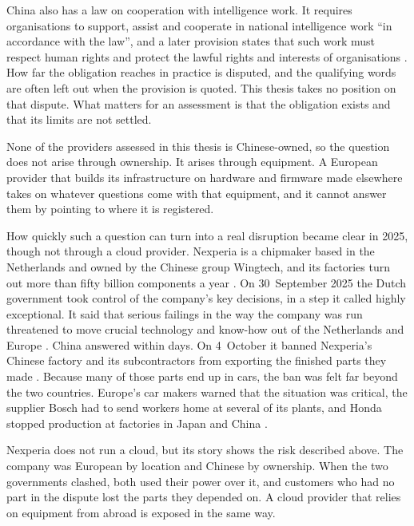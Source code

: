 China also has a law on cooperation with intelligence work. It requires
organisations to support, assist and cooperate in national intelligence work
\enquote{in accordance with the law}, and a later provision states that such work
must respect human rights and protect the lawful rights and interests of
organisations \cite{ChinaNIL_2017}. How far the obligation reaches in practice is
disputed, and the qualifying words are often left out when the provision is
quoted. This thesis takes no position on that dispute. What matters for an
assessment is that the obligation exists and that its limits are not settled.

None of the providers assessed in this thesis is Chinese-owned, so the question
does not arise through ownership. It arises through equipment. A European provider
that builds its infrastructure on hardware and firmware made elsewhere takes on
whatever questions come with that equipment, and it cannot answer them by pointing
to where it is registered.

How quickly such a question can turn into a real disruption became clear in 2025,
though not through a cloud provider. Nexperia is a chipmaker based in the
Netherlands and owned by the Chinese group Wingtech, and its factories turn out
more than fifty billion components a year \cite{AlJazeera_Nexperia_2025}. On
30~September 2025 the Dutch government took control of the company's key decisions,
in a step it called highly exceptional. It said that serious failings in the way
the company was run threatened to move crucial technology and know-how out of the
Netherlands and Europe \cite{NL_Nexperia_2025}. China answered within days. On
4~October it banned Nexperia's Chinese factory and its subcontractors from exporting
the finished parts they made \cite{AlJazeera_Nexperia_2025}. Because many of those
parts end up in cars, the ban was felt far beyond the two countries. Europe's car
makers warned that the situation was critical, the supplier Bosch had to send
workers home at several of its plants, and Honda stopped production at factories in
Japan and China \cite{Sourceability_Nexperia_2026}.

Nexperia does not run a cloud, but its story shows the risk described above. The
company was European by location and Chinese by ownership. When the two governments
clashed, both used their power over it, and customers who had no part in the
dispute lost the parts they depended on. A cloud provider that relies on equipment
from abroad is exposed in the same way.


